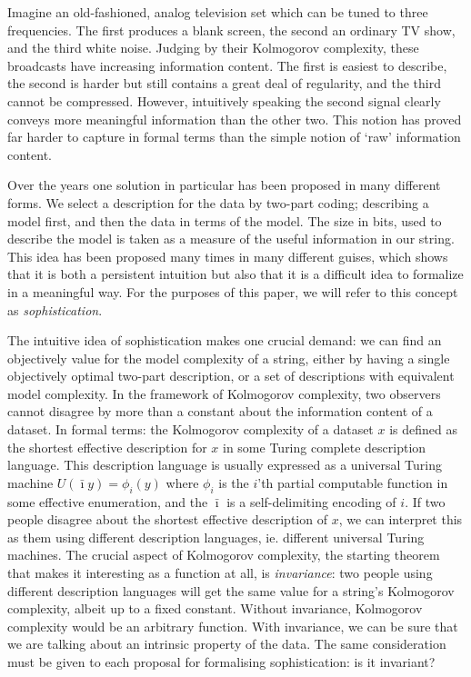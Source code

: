 \documentclass{style/llncs}
\begin{document}
Imagine an old-fashioned, analog television set which can be tuned to three frequencies. The first produces a blank screen, the second an ordinary TV show, and the third white noise. Judging by their Kolmogorov complexity, these  broadcasts have increasing information content. The first is easiest to describe, the second is harder but still contains a great deal of regularity, and the third cannot be compressed. However, intuitively speaking the second signal clearly conveys more meaningful information than the other two. This notion has proved far harder to capture in formal terms than the simple notion of `raw' information content. 

Over the years one solution in particular has been proposed in many different forms. We select a description for the data by two-part coding; describing a model first, and then the data in terms of the model. The size in bits, used to describe the model is taken as a measure of the useful information in our string. This idea has been proposed many times in many different guises, which shows that it is both a persistent intuition but also that it is a difficult idea to formalize in a meaningful way. For the purposes of this paper, we will refer to this concept as \emph{sophistication}\footnotemark. 


The intuitive idea of sophistication makes one crucial demand: we can find an objectively value for the model complexity of a string, either by having a single objectively optimal two-part description, or a set of descriptions with equivalent model complexity. In the framework of Kolmogorov complexity, two observers cannot disagree by more than a constant about the information content of a dataset. In formal terms: the Kolmogorov complexity of a dataset $x$ is defined as the shortest effective description for $x$ in some Turing complete description language. This description language is usually expressed as a universal Turing machine $U(\bar\imath y) = \phi_i(y)$ where $\phi_i$ is the $i$'th partial computable function in some effective enumeration, and the $\bar\imath$ is a self-delimiting encoding of $i$. If two people disagree about the shortest effective description of $x$, we can interpret this as them using different description languages, ie. different universal Turing machines. The crucial aspect of Kolmogorov complexity, the starting theorem that makes it interesting as a function at all, is \emph{invariance}: two people using different description languages will get the same value for a string's Kolmogorov complexity, albeit up to a fixed constant. Without invariance, Kolmogorov complexity would be an arbitrary function. With invariance, we can be sure that we are talking about an intrinsic property of the data. The same consideration must be given to each proposal for formalising sophistication: is it invariant? 
\end{document}
